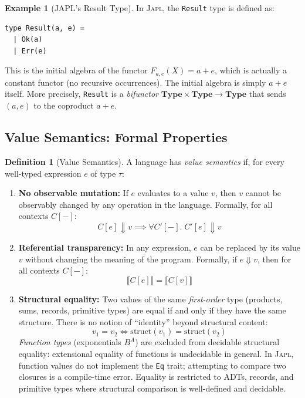 \documentclass[11pt]{article}
\theoremstyle{definition}
\newtheorem{definition}[theorem]{Definition}
\newtheorem{example}[theorem]{Example}
\theoremstyle{remark}
\newcommand{\Type}{\mathbf{Type}}
\newcommand{\sem}[1]{\llbracket #1 \rrbracket}
\newcommand{\japl}{\textsc{Japl}}
\begin{document}
\begin{example}[JAPL's Result Type]
\label{ex:result-initial}
In \japl{}, the \texttt{Result} type is defined as:
\begin{lstlisting}
type Result(a, e) =
  | Ok(a)
  | Err(e)
\end{lstlisting}
This is the initial algebra of the functor $F_{a,e}(X) = a + e$,
which is actually a constant functor (no recursive occurrences).  The
initial algebra is simply $a + e$ itself.  More precisely,
\texttt{Result} is a \emph{bifunctor} $\Type \times \Type \to \Type$
that sends $(a, e)$ to the coproduct $a + e$.
\end{example}

\subsection{Value Semantics: Formal Properties}
\label{sec:formal:value-semantics}

\begin{definition}[Value Semantics]
\label{def:value-semantics}
A language has \emph{value semantics} if, for every well-typed
expression $e$ of type $\tau$:
\begin{enumerate}
  \item \textbf{No observable mutation:} If $e$ evaluates to a value
    $v$, then $v$ cannot be observably changed by any operation in
    the language.  Formally, for all contexts $C[-]$:
    \[
      C[e] \Downarrow v \implies \forall C'[-].\; C'[e] \Downarrow v
    \]
  \item \textbf{Referential transparency:} In any expression, $e$
    can be replaced by its value $v$ without changing the meaning of
    the program.  Formally, if $e \Downarrow v$, then for all
    contexts $C[-]$:
    \[
      \sem{C[e]} = \sem{C[v]}
    \]
  \item \textbf{Structural equality:} Two values of the same
    \emph{first-order} type (products, sums, records, primitive types)
    are equal if and only if they have the same structure.  There is
    no notion of ``identity'' beyond structural content:
    \[
      v_1 = v_2 \iff \mathrm{struct}(v_1) = \mathrm{struct}(v_2)
    \]
    \emph{Function types} (exponentials $B^A$) are excluded from
    decidable structural equality: extensional equality of functions
    is undecidable in general.  In \japl{}, function values do not
    implement the \texttt{Eq} trait; attempting to compare two
    closures is a compile-time error.  Equality is restricted to ADTs,
    records, and primitive types where structural comparison is
    well-defined and decidable.
\end{enumerate}
\end{definition}
\end{document}
